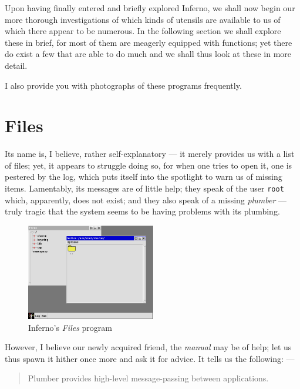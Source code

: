 \documentclass[a5paper,twoside,12pt]{report}
\begin{document}
  Upon having finally entered and briefly explored Inferno, we shall now begin our more thorough investigations of which kinds of utensils are available to us of which there appear to be numerous. In the following section we shall explore these in brief, for most of them are meagerly equipped with functions; yet there do exist a few that are able to do much and we shall thus look at these in more detail.

  I also provide you with photographs of these programs frequently.

  \section*{Files}

  Its name is, I believe, rather self-explanatory — it merely provides us with a list of files; yet, it appears to struggle doing so, for when one tries to open it, one is pestered by the log, which puts itself into the spotlight to warn us of missing items. Lamentably, its messages are of little help; they speak of the user \texttt{root} which, apparently, does not exist; and they also speak of a missing \textit{plumber} — truly tragic that the system seems to be having problems with its plumbing.

  \begin{figure}
    \centering
    \includegraphics[width=0.5\textwidth]{imgs/files.png}
    \caption{Inferno's \textit{Files} program}
  \end{figure}

  However, I believe our newly acquired friend, the \textit{manual} may be of help; let us thus spawn it hither once more and ask it for advice. It tells us the following: —

  \begin{quote}
    Plumber provides high-level message-passing between applications.
  \end{quote}
\end{document}
